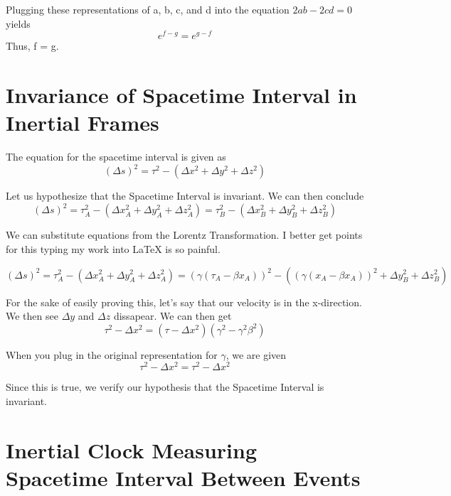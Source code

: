 \documentclass{article}
\begin{document}
Plugging these representations of a, b, c, and d into the equation \(2ab - 2cd = 0\) yields
\[
  e^{f - g} = e^{g - f}
\]
Thus, f = g.

\newpage
\section{Invariance of Spacetime Interval in Inertial Frames}
The equation for the spacetime interval is given as
\[
  (\Delta s)^2 = \tau^2 - (\Delta x^2 + \Delta y^2 + \Delta z^2)
\]

Let us hypothesize that the Spacetime Interval is invariant. We can then conclude
\[
  (\Delta s)^2 = \tau_A^2 - (\Delta x_A^2 + \Delta y_A^2 + \Delta z_A^2) = \tau_B^2 - (\Delta x_B^2 + \Delta y_B^2 + \Delta z_B^2)
\]

We can substitute equations from the Lorentz Transformation. I better get points for this typing my work into LaTeX is so painful.

\[
  (\Delta s)^2 = \tau_A^2 - (\Delta x_A^2 + \Delta y_A^2 + \Delta z_A^2) = (\gamma (\tau_A - \beta x_A))^2 - ((\gamma (x_A - \beta x_A))^2 + \Delta y_B^2 + \Delta z_B^2)
\]

For the sake of easily proving this, let's say that our velocity is in the x-direction. We then see \(\Delta y\) and \(\Delta z\) dissapear. We can then get
\[
  \tau^2 - \Delta x^2 = (\tau - \Delta x^2)(\gamma^2 - \gamma^2 \beta^2)
\]

When you plug in the original representation for \(\gamma\), we are given
\[
  \tau^2 - \Delta x^2 = \tau^2 - \Delta x^2
\]

Since this is true, we verify our hypothesis that the Spacetime Interval is invariant.

\newpage
\section{Inertial Clock Measuring Spacetime Interval Between Events}
\end{document}
